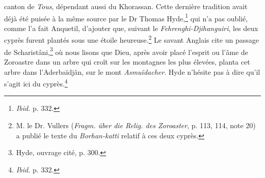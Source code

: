 \documentclass{article}
\begin{document}
canton de \emph{Tous}, dépendant aussi du Khorassan. Cette dernière tradition avait déjà été puisée à la même source par le Dr Thomas Hyde,\footnote{\emph{Ibid.} p. 332.} qui n'a pas oublié, comme l'a fait Anquetil, d'ajouter que, suivant le \emph{Fehrenghi-Djihanguiri}, les deux cyprès furent plantés sous une étoile heureuse.\footnote{M. le Dr. Vullers (\emph{Fragm. über die Relig. des Zoroaster}, p. 113, 114, note 20) a publié le texte du \emph{Borhan-katti} relatif à ces deux cyprès.} Le savant Anglais cite un passage de Scharistâni,\footnote{Hyde, ouvrage cité, p. 300.} où nous lisons que Dieu, après avoir placé l'esprit ou l'âme de Zoroastre dans un arbre qui croît sur les montagnes les plus élevées, planta cet arbre dans l'Aderbaïdjân, sur le mont \emph{Asmuîdacher}. Hyde n'hésite pas à dire qu'il s'agit ici du cyprès.\footnote{\emph{Ibid.} p. 332.}
\end{document}
